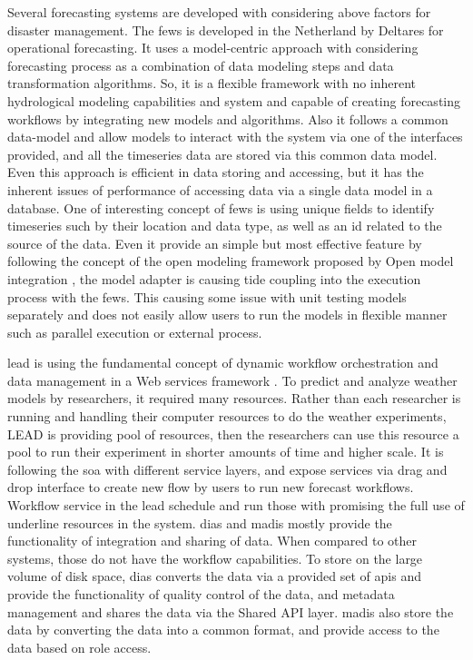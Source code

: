 \documentclass[conference]{IEEEtran}
\newcommand{\db}[1]{\textcolor{blue!40}{#1}}
\begin{document}
\db{Several forecasting systems are} developed with considering above factors for disaster management. The \acrshort{fews}\cite{Werner2013TheSystem} is developed in the Netherland by Deltares for operational forecasting. It uses a model-centric approach with considering forecasting process as a combination of data modeling steps and data transformation algorithms. So, it is a flexible framework with no inherent hydrological modeling capabilities and system and capable of creating forecasting workflows by integrating new models and algorithms. Also it follows a common data-model and allow models to interact with the system via one of the interfaces provided, and all the timeseries data are stored via this common data model. Even this approach is efficient in data storing and accessing, but it has the inherent issues of performance of accessing data via a single data model in a database. One of interesting concept of \acrshort{fews} is using unique fields to identify timeseries such by their location and data type, as well as an id related to the source of the data. Even it provide an simple but most effective feature by following the concept of the open modeling framework proposed by Open model integration \cite{Kokkonen2003InterfacingXML}, the model adapter is causing tide coupling into the execution process with the \acrshort{fews}. This causing some issue with unit testing models separately and does not easily allow users to run the models in flexible manner such as parallel execution or external process.

\acrfull{lead} is using the fundamental concept of  dynamic workflow orchestration and
data management in a Web services framework \cite{Droegemeier2005Service-OrientedWeather}. To predict and analyze weather models
by researchers, it required many resources. Rather than each researcher is running and
handling their computer resources to do the weather experiments, LEAD is providing pool of resources, then the researchers can use this resource a pool to run their
experiment in shorter amounts of time and higher scale. It is following the \acrfull{soa} with different service layers, and expose services via drag and drop interface to create new flow by users to run new forecast workflows. Workflow service in the \acrshort{lead} schedule and run those with promising the full use of underline resources in the system. \acrfull{dias}\cite{Kawasaki2018DataReduction} and \acrfull{madis}\cite{Macdermaid2005ARCHITECTUREP2.39} mostly provide the functionality of integration and sharing of data. When compared to other systems, those do not have the workflow capabilities. To store on the large volume of disk space, \acrshort{dias} converts the data via a provided set of \acrshort{api}s and provide the functionality of quality control of the data, and metadata management and  shares the data via the Shared API layer. \acrshort{madis} also store the data by converting the data into a common format, and provide access to the data based on role access.
\end{document}
